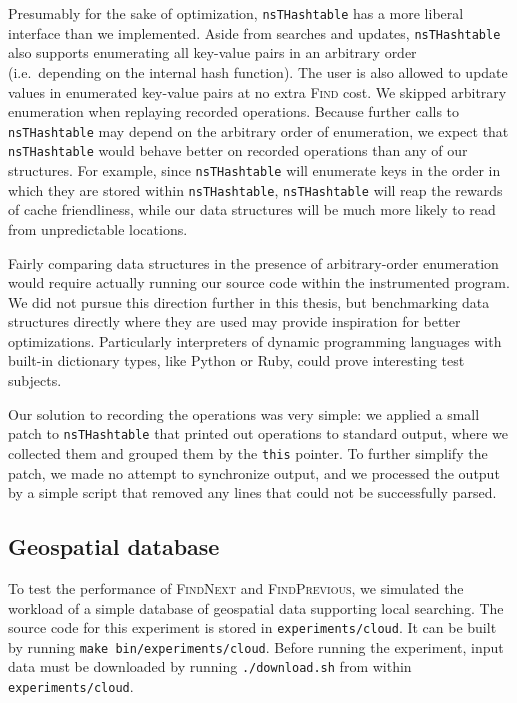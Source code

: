 Presumably for the sake of optimization, \texttt{nsTHashtable} has a more
liberal interface than we implemented. Aside from searches and updates,
\texttt{nsTHashtable} also supports enumerating all key-value pairs in
an arbitrary order (i.e.\ depending on the internal hash function).
The user is also allowed to update values in enumerated key-value pairs
at no extra \textsc{Find} cost.
We skipped arbitrary enumeration when replaying recorded operations.
Because further calls to \texttt{nsTHashtable} may depend on the arbitrary
order of enumeration, we expect that \texttt{nsTHashtable} would behave
better on recorded operations than any of our structures. For example,
since \texttt{nsTHashtable} will enumerate keys in the order in which they
are stored within \texttt{nsTHashtable}, \texttt{nsTHashtable} will reap
the rewards of cache friendliness, while our data structures will be much
more likely to read from unpredictable locations.

Fairly comparing data structures in the presence of arbitrary-order enumeration
would require actually running our source code within the instrumented program.
We did not pursue this direction further in this thesis, but benchmarking data
structures directly where they are used may provide inspiration for better
optimizations. Particularly interpreters of dynamic programming languages
with built-in dictionary types, like Python or Ruby, could prove interesting
test subjects.

Our solution to recording the operations was very simple: we applied a small
patch to \texttt{nsTHashtable} that printed out operations to standard output,
where we collected them and grouped them by the \texttt{this} pointer.
To further simplify the patch, we made no attempt to synchronize output,
and we processed the output by a simple script that removed any lines that
could not be successfully parsed.

\subsection{Geospatial database}
To test the performance of \textsc{FindNext} and \textsc{FindPrevious}, we
simulated the workload of a simple database of geospatial data supporting
local searching. The source code for this experiment is stored in
\texttt{experiments/cloud}. It can be built by running \texttt{make
bin/experiments/cloud}. Before running the experiment, input data must
be downloaded by running \texttt{./download.sh} from within
\texttt{experiments/cloud}.

